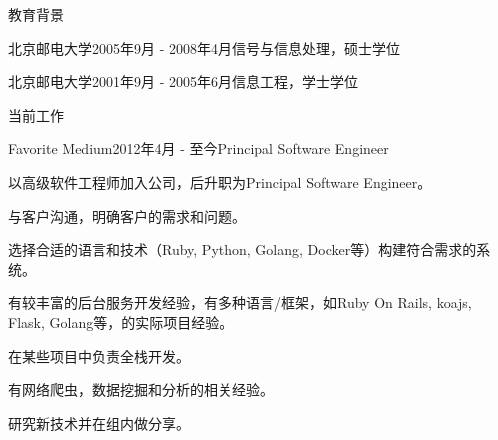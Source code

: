 \documentclass{resume} %
\newcommand{\kaiti}{\CJKfamily{kaiti}}
\begin{document}
\begin{rSection}{\kaiti 教育背景}
\begin{rSubsection}{北京邮电大学}{2005年9月 - 2008年4月}{信号与信息处理，硕士学位}{}
\end{rSubsection}

\begin{rSubsection}{北京邮电大学}{2001年9月 - 2005年6月}{信息工程，学士学位}{}
\end{rSubsection}
\end{rSection}

\begin{rSection}{\kaiti 当前工作}

\begin{rSubsection}{Favorite Medium}{2012年4月 - 至今}{Principal Software Engineer}{}{}
\begin{rSubsectionList}
\item 以高级软件工程师加入公司，后升职为Principal Software Engineer。
\item 与客户沟通，明确客户的需求和问题。
\item 选择合适的语言和技术（Ruby, Python, Golang, Docker等）构建符合需求的系统。
\item 有较丰富的后台服务开发经验，有多种语言/框架，如Ruby On Rails, koajs, Flask, Golang等，的实际项目经验。
\item 在某些项目中负责全栈开发。
\item 有网络爬虫，数据挖掘和分析的相关经验。
\item 研究新技术并在组内做分享。
\end{rSubsectionList}
\end{rSubsection}
\end{rSection}
\end{document}
